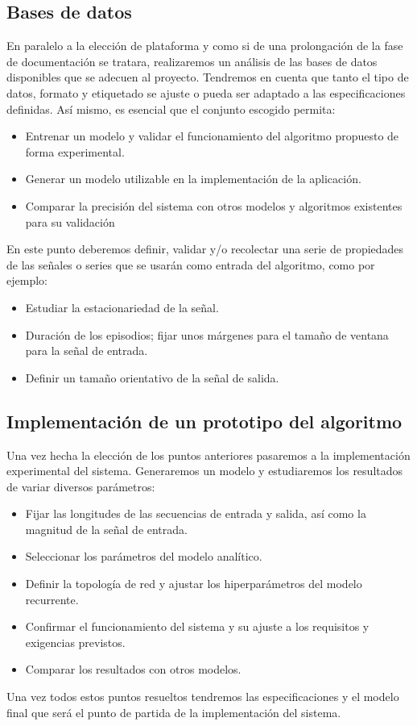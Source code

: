 \subsection{Bases de datos}
En paralelo a la elección de plataforma y como si de una prolongación de la fase de documentación se tratara, realizaremos un análisis de las bases de datos disponibles que se adecuen al proyecto. Tendremos en cuenta que tanto el tipo de datos, formato y etiquetado se ajuste o pueda ser adaptado a las especificaciones definidas. Así mismo, es esencial que el conjunto escogido permita:
\begin{itemize}
  \item Entrenar un modelo y validar el funcionamiento del algoritmo propuesto de forma experimental.
  \item Generar un modelo utilizable en la implementación de la aplicación.
  \item Comparar la precisión del sistema con otros modelos y algoritmos existentes para su validación
\end{itemize}
En este punto deberemos definir, validar y/o recolectar una serie de propiedades de las señales o series que se usarán como entrada del algoritmo, como por ejemplo:
\begin{itemize}
  \item Estudiar la estacionariedad de la señal.
  \item Duración de los episodios; fijar unos márgenes para el tamaño de ventana para la señal de entrada.
  \item Definir un tamaño orientativo de la señal de salida.
\end{itemize}

\subsection{Implementación de un prototipo del algoritmo}
Una vez hecha la elección de los puntos anteriores pasaremos a la implementación experimental del sistema. Generaremos un modelo y estudiaremos los resultados de variar diversos parámetros:
\begin{itemize}
  \item Fijar las longitudes de las secuencias de entrada y salida, así como la magnitud de la señal de entrada.
  \item Seleccionar los parámetros del modelo analítico.
  \item Definir la topología de red y ajustar los hiperparámetros del modelo recurrente.
  \item Confirmar el funcionamiento del sistema y su ajuste a los requisitos y exigencias previstos.
  \item Comparar los resultados con otros modelos.
\end{itemize}
Una vez todos estos puntos resueltos tendremos las especificaciones y el modelo final que será el punto de partida de la implementación del sistema.

